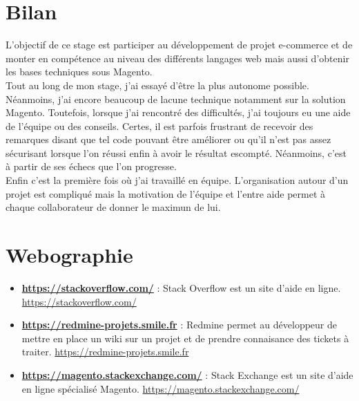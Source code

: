 \documentclass[12pt, a4paper, twoside]{report}
\newcommand{\mychapter}[2]{
	\setcounter{chapter}{#1}
	\setcounter{section}{0}
	\chapter*{#2}
	\addcontentsline{toc}{chapter}{#2}
}
\begin{document}
\chapter{Bilan}

L'objectif de ce stage est participer au développement de projet e-commerce et de monter en compétence au niveau des différents langages web mais aussi d'obtenir les bases techniques sous Magento. \\

Tout au long de mon stage, j'ai essayé d'être la plus autonome possible. Néanmoins, j'ai encore beaucoup de lacune technique notamment sur la solution Magento. Toutefois, lorsque j'ai rencontré des difficultés, j'ai toujours eu une aide de l'équipe ou des conseils. Certes, il est parfois frustrant de recevoir des remarques disant que tel code pouvant être améliorer ou qu'il n'est pas assez sécurisant lorsque l'on réussi enfin à avoir le résultat escompté. Néanmoins, c'est à partir de ses échecs que l'on progresse. \\

Enfin c'est la première fois où j'ai travaillé en équipe. L'organisation autour d'un projet est compliqué mais la motivation de l'équipe et l'entre aide permet à chaque collaborateur de donner le maximun de lui.   

\mychapter{8}{Webographie}

\begin{itemize}
	\item \textbf{\href{Stack Overflow}{https://stackoverflow.com/}} : Stack Overflow est un site d'aide en ligne. \href{Stack Overflow}{https://stackoverflow.com/}
	\item \textbf{\href{Redmine}{https://redmine-projets.smile.fr}} : Redmine permet au développeur de mettre en place un wiki sur un projet et de prendre connaisance des tickets à traiter. \href{Redmine}{https://redmine-projets.smile.fr}
	\item \textbf{\href{Magento}{https://magento.stackexchange.com/}} : Stack Exchange est un site d'aide en ligne spécialisé Magento. \href{Magento}{https://magento.stackexchange.com/}
\end{itemize}
\end{document}
